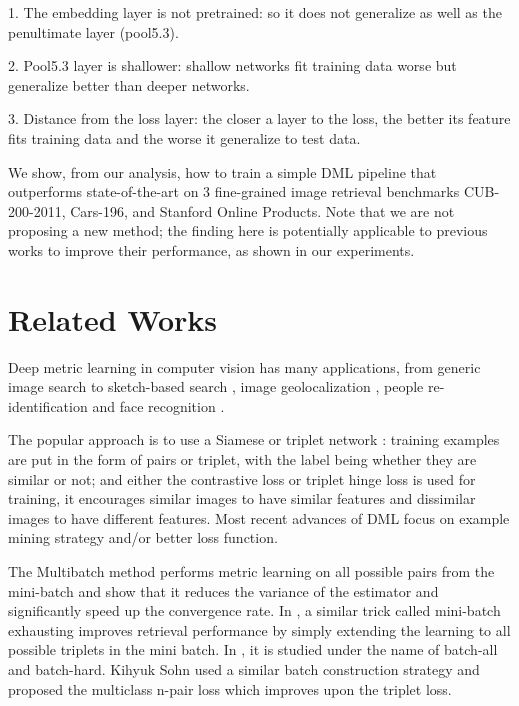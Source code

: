 \documentclass[10pt,twocolumn,letterpaper]{article}
\begin{document}
1. The embedding layer is not pretrained: so it does not generalize as well as the penultimate layer (pool5.3).

2. Pool5.3 layer is shallower: shallow networks fit training data worse but generalize better than deeper networks.

3. Distance from the loss layer: the closer a layer to the loss, the better its feature fits training data and the worse it generalize to test data.

We show, from our analysis, how to train a simple DML pipeline that outperforms state-of-the-art on 3 fine-grained image retrieval benchmarks CUB-200-2011, Cars-196, and Stanford Online Products. Note that we are not proposing a new method; the finding here is potentially applicable to previous works to improve their performance, as shown in our experiments.


\section{Related Works}

Deep metric learning in computer vision has many applications, from generic image search \cite{wang2014learning} to sketch-based search \cite{sangkloy2016sketchy}, image geolocalization \cite{vo2016localizing, vo2017revisiting}, people re-identification \cite{ding2015deep,hermans2017defense} and face recognition \cite{schroff2015facenet, Parkhi15}.

The popular approach is to use a Siamese \cite{bromley1994signature,chopra2005learning} or triplet network \cite{wu2013online,wang2014learning,vo2016localizing}: training examples are put in the form of pairs or triplet, with the label being whether they are similar or not; and either the contrastive loss or triplet hinge loss is used for training, it encourages similar images to have similar features and dissimilar images to have different features.
Most recent advances of DML focus on example mining strategy and/or better loss function.

The Multibatch method \cite{tadmor2016learning} performs metric learning on all possible pairs from the mini-batch and show that it reduces the variance of the estimator and significantly speed up the convergence rate. In \cite{vo2016localizing},
a similar trick called mini-batch exhausting improves retrieval performance by simply extending the learning to all possible triplets in the mini batch. In \cite{hermans2017defense}, it is studied under the name of batch-all and batch-hard. Kihyuk Sohn \cite{sohn2016improved} used a similar batch construction strategy and proposed the multiclass n-pair loss which improves upon the triplet loss.
\end{document}
